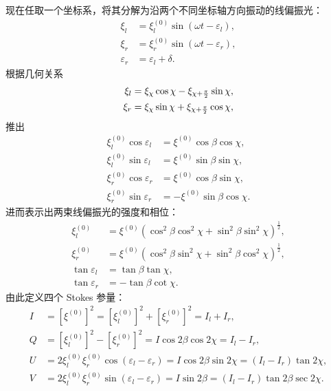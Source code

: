 \documentclass[../天体物理基础.tex]{subfiles}
\begin{document}
现在任取一个坐标系，将其分解为沿两个不同坐标轴方向振动的线偏振光：
\begin{align}
\xi_l&=\xi_l^{(0)}\sin(\omega t-\varepsilon_l),\label{2.1.4}\\
\xi_r&=\xi_r^{(0)}\sin(\omega t-\varepsilon_r),\label{2.1.5}\\
\varepsilon_{r}&=\varepsilon_{l}+\delta.
\end{align}
根据几何关系
\begin{align}
\xi_l&=\xi_\chi\cos\chi-\xi_{\chi+\frac\pi2}\sin\chi,\notag\\
\xi_r&=\xi_\chi\sin\chi+\xi_{\chi+\frac\pi2}\cos\chi,\notag
\end{align}
推出
\begin{align}
\xi_l^{\left(0\right)}\cos\varepsilon_l&=\xi^{\left(0\right)}\cos\beta\cos\chi,\\
\xi_l^{\left(0\right)}\sin\varepsilon_l&=\xi^{\left(0\right)}\sin\beta\sin\chi,\\
\xi_r^{\left(0\right)}\cos\varepsilon_r&=\xi^{\left(0\right)}\cos\beta\sin\chi,\\
\xi_r^{\left(0\right)}\sin\varepsilon_r&=-\xi^{\left(0\right)}\sin\beta\cos\chi.
\end{align}
进而表示出两束线偏振光的强度和相位：
\begin{align}
\xi_l^{\left(0\right)}&=\xi^{\left(0\right)}\left(\cos^2\beta\cos^2\chi+\sin^2\beta\sin^2\chi\right)^\frac12,\\
\xi_r^{\left(0\right)}&=\xi^{\left(0\right)}\left(\cos^2\beta\sin^2\chi+\sin^2\beta\cos^2\chi\right)^\frac12,\\
\tan\varepsilon_l&=\tan\beta\tan\chi,\\
\tan\varepsilon_r&=-\tan\beta\cot\chi.
\end{align}
由此定义四个 Stokes 参量：
\begin{align}
I&=\left[\xi^{\left(0\right)}\right]^2=
\left[\xi_l^{\left(0\right)}\right]^2+\left[\xi_r^{\left(0\right)}\right]^2=I_l+I_r,\\
Q&=\left[\xi_l^{\left(0\right)}\right]^2-\left[\xi_r^{\left(0\right)}\right]^2=I\cos2\beta\cos2\chi=I_l-I_r,\\
U&=2\xi_l^{\left(0\right)}\xi_r^{\left(0\right)}\cos\left(\varepsilon_l-\varepsilon_r\right)=I\cos2\beta\sin2\chi=\left(I_l-I_r\right)\tan2\chi,\\
V&=2\xi_l^{\left(0\right)}\xi_r^{\left(0\right)}\sin\left(\varepsilon_l-\varepsilon_r\right)=I\sin2\beta=\left(I_l-I_r\right)\tan2\beta\sec2\chi.
\end{align}
\end{document}
